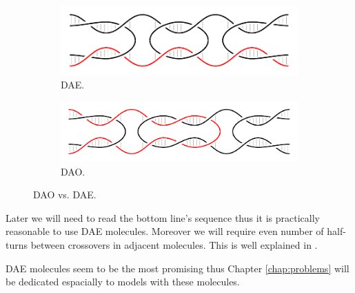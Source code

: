 		\begin{figure}[h]
		\begin{center}
			\begin{subfigure}[b]{0.433\textwidth} %
				\includegraphics[width=\textwidth]{./figures/dao-dae/dae.pdf}
				\caption{DAE.}
				\label{fig:dao}
			\end{subfigure}
			\begin{subfigure}[b]{0.5\textwidth} %
				\includegraphics[width=\textwidth]{./figures/dao-dae/dao.pdf}
				\caption{DAO.}
				\label{fig:dae}
			\end{subfigure}
			\caption{DAO vs. DAE.}
			\label{fig:dao-dae}
		\end{center}
		\end{figure}
		
		Later we will need to read the bottom line's sequence thus it is practically reasonable to use DAE molecules. Moreover we will require even number of half-turns between crossovers in adjacent molecules. This is well explained in \cite[p.37]{winfree_phd}.
		
		DAE molecules seem to be the most promising %
		thus Chapter \ref{chap:problems} will be dedicated espacially to models with these molecules.